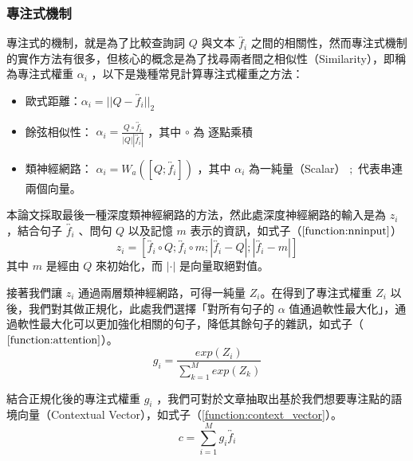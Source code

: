 \subsubsection{專注式機制}
專注式的機制，就是為了比較查詢詞 $Q$ 與文本 $\overleftrightarrow{f_i}$ 之間的相關性，然而專注式機制的實作方法有很多，但核心的概念是為了找尋兩者間之相似性（Similarity），即稱為專注式權重 $\alpha_i$ ，以下是幾種常見計算專注式權重之方法：
\itemsep -4pt
\begin{itemize}
    \item 歐式距離：$\alpha_i = ||Q-\overleftrightarrow{f_i}||_{2}$
    \item 餘弦相似性：
            $\alpha_i = \frac{Q \circ \overleftrightarrow{f_i} }{|Q| |\overleftrightarrow{f_i}| } $ 
            ，其中 $\circ$ 為 逐點乘積
    \item 類神經網路： $\alpha_i = W_a ([Q ; \overleftrightarrow{f_i}]) $ 
        ，其中 $\alpha_i$ 為一純量（Scalar） $;$ 代表串連兩個向量。
\end{itemize}
本論文採取最後一種深度類神經網路的方法，然此處深度神經網路的輸入是為 $z_i$ ，結合句子 $\overleftrightarrow{f_i}$ 、問句 $Q$ 以及記憶 $m$ 表示的資訊，如式子（$\ref{function:nninput}$）
\begin{equation}
    z_i = [ \overleftrightarrow{f_i} \circ Q ; \overleftrightarrow{f_i} \circ m ; |\overleftrightarrow{f_i} - Q| ; | \overleftrightarrow{f_i} - m| ] \label{function:nninput}
\end{equation}
其中 $m$ 是經由 $Q$ 來初始化，而 $|\cdot|$ 是向量取絕對值。

接著我們讓 $z_i$ 通過兩層類神經網路，可得一純量 $Z_i$。在得到了專注式權重 $Z_i$ 以後，我們對其做正規化，此處我們選擇「對所有句子的 $\alpha$ 值通過軟性最大化」，通過軟性最大化可以更加強化相關的句子，降低其餘句子的雜訊，如式子（$\ref{function:attention}$）。
\begin{equation}
    g_i = \frac{exp{(Z_i)}}{\sum_{k=1}^{M} exp(Z_k)} \label{function:attention}
\end{equation}

結合正規化後的專注式權重 $g_i$ ，我們可對於文章抽取出基於我們想要專注點的語境向量（Contextual Vector），如式子（\ref{function:context_vector}）。
\begin{equation}
    c = \sum_{i=1}^{M} g_i \overleftrightarrow{f_i} \label{function:context_vector}
\end{equation}
